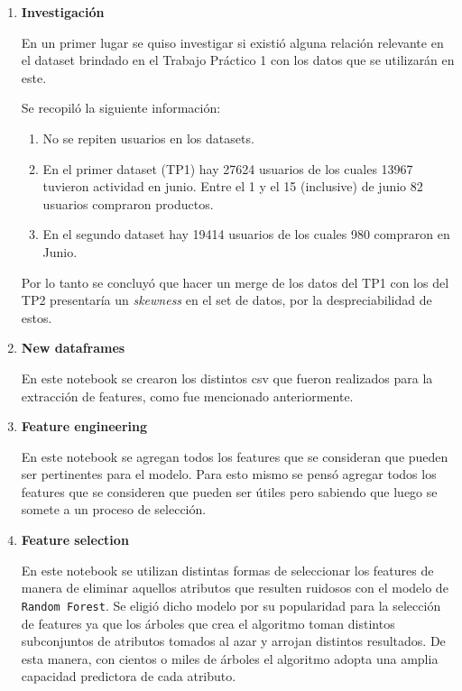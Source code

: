 \documentclass[a4paper]{article}
\begin{document}
\begin{enumerate} 
\item \textbf{Investigación}

En un primer lugar se quiso investigar si existió alguna relación relevante en el dataset brindado en el Trabajo Práctico 1 con los datos que se utilizarán en este. 

Se recopiló la siguiente información:

\begin{enumerate}
\item No se repiten usuarios en los datasets.
\item En el primer dataset (TP1) hay 27624 usuarios de los cuales 13967 tuvieron actividad en junio. Entre el 1 y el 15 (inclusive) de junio 82 usuarios compraron productos.
\item En el segundo dataset hay 19414 usuarios de los cuales 980 compraron en Junio.
\end{enumerate}

Por lo tanto se concluyó que hacer un merge de los datos del TP1 con los del TP2 presentaría un \textit{skewness} en el set de datos, por la despreciabilidad de estos.
	
\item \textbf{New dataframes}	

En este notebook se crearon los distintos csv que fueron realizados para la extracción de features, como fue mencionado anteriormente. 

\item \textbf{Feature engineering}

En este notebook se agregan todos los features que se consideran que pueden ser pertinentes para el modelo. Para esto mismo se pensó agregar todos los features que se consideren que pueden ser útiles pero sabiendo que luego se somete a un proceso de selección. 

\item \textbf{Feature selection}

En este notebook se utilizan distintas formas de seleccionar los features de manera de eliminar aquellos atributos que resulten ruidosos con el modelo de \texttt{Random Forest}. Se eligió dicho modelo por su popularidad para la selección de features ya que los árboles que crea el algoritmo toman distintos subconjuntos de atributos tomados al azar y arrojan distintos resultados. De esta manera, con cientos o miles de árboles el algoritmo adopta una amplia capacidad predictora de cada atributo.


\end{enumerate}
\end{document}

